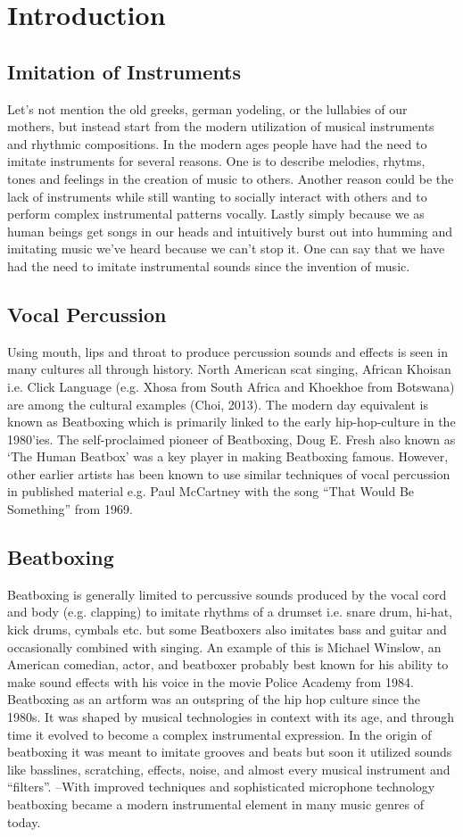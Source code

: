\section{ Introduction }
\subsection{ Imitation of Instruments }
Let’s not mention the old greeks, german yodeling, or the lullabies of our mothers, but instead start from the modern utilization of musical instruments and rhythmic compositions. In the modern ages people have had the need to imitate instruments for several reasons. One is to describe melodies, rhytms, tones and feelings in the creation of music to others. Another reason could be the lack of instruments while still wanting to socially interact with others and to perform complex instrumental patterns vocally. Lastly simply because we as human beings get songs in our heads and intuitively burst out into humming and imitating music we’ve heard because we can’t stop it. One can say that we have had the need to imitate instrumental sounds since the invention of music.
\subsection{ Vocal Percussion }
Using mouth, lips and throat to produce percussion sounds and effects is seen in many cultures all through history. North American scat singing, African Khoisan i.e. Click Language (e.g. Xhosa from South Africa and Khoekhoe from Botswana) are among the cultural examples (Choi, 2013).	
The modern day equivalent is known as Beatboxing which is primarily linked to the early hip-hop-culture in the 1980’ies. The self-proclaimed pioneer of Beatboxing, Doug E. Fresh also known as ‘The Human Beatbox’ was a key player in making Beatboxing famous. However, other earlier artists has been known to use similar techniques of vocal percussion in published material e.g. Paul McCartney with the song “That Would Be Something” from 1969.
\subsection{ Beatboxing }
Beatboxing is generally limited to percussive sounds produced by the vocal cord and body (e.g. clapping) to imitate rhythms of a drumset i.e. snare drum, hi-hat, kick drums, cymbals etc. but some Beatboxers also imitates bass and guitar and occasionally combined with singing. An example of this is Michael Winslow, an American comedian, actor, and beatboxer probably best known for his ability to make sound effects with his voice in the movie Police Academy from 1984. Beatboxing as an artform was an outspring of the hip hop culture since the 1980s. It was shaped by musical technologies in context with its age, and through time it evolved to become a complex instrumental expression. In the origin of beatboxing it was meant to imitate grooves and beats but soon it utilized sounds like basslines, scratching, effects, noise, and almost every musical instrument and “filters”. –With improved techniques and sophisticated microphone technology beatboxing became a modern instrumental element in many music genres of today.
